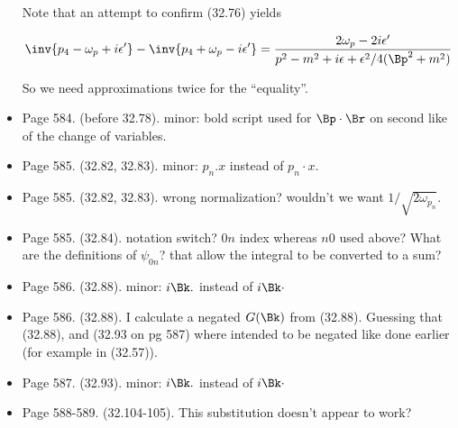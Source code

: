 \begin{itemize}
Note that an attempt to confirm (32.76) yields

\begin{align*}
\inv{p_4 - \omega_p + i\epsilon'}
-\inv{p_4 + \omega_p - i\epsilon'}
=
\frac{2 \omega_p - 2 i \epsilon'}{ p^2 - m^2 + i \epsilon + \epsilon^2/4(\Bp^2 + m^2)}
\end{align*}

So we need approximations twice for the ``equality''.

\item Page 584.  (before 32.78).  minor: bold script used for $\Bp \cdot \Br$ on second like of the change of variables.
\item Page 585.  (32.82, 32.83).  minor: $p_n . x$ instead of $p_n \cdot x$.
\item Page 585.  (32.82, 32.83).  wrong normalization?  wouldn't we want $1/\sqrt{2 \omega_{p_n}}$.
\item Page 585.  (32.84).  notation switch?  $0n$ index whereas $n0$ used above?  What are the definitions of $\psi_{0n}$? that allow the integral to be converted to a sum?
\item Page 586.  (32.88).  minor: $i \Bk .$ instead of $i \Bk \cdot$
\item Page 586.  (32.88).  I calculate a negated $G(\Bk)$ from (32.88).  Guessing that (32.88), and (32.93 on pg 587) where intended to be negated like done earlier (for example in (32.57)). 
\item Page 587.  (32.93).  minor: $i \Bk .$ instead of $i \Bk \cdot$
\item Page 588-589.  (32.104-105).  This substitution doesn't appear to work?


\end{itemize}
